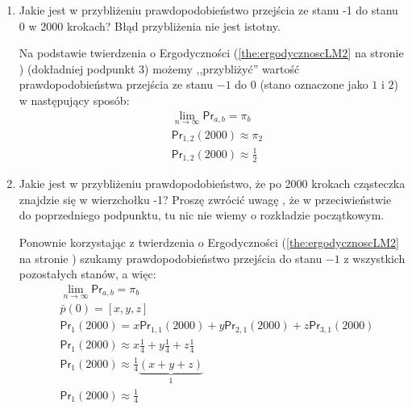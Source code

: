 \documentclass[a4paper,12pt]{article}
\theoremstyle{definition}%
\theoremstyle{definition}
\theoremstyle{problem}
\begin{document}
\begin{enumerate}[label=\alph*)]
\item Jakie jest w przybliżeniu prawdopodobieństwo przejścia ze stanu -1 do stanu 0 w 2000 krokach? Błąd przybliżenia nie jest istotny.

Na podstawie twierdzenia o Ergodyczności (\ref{the:ergodycznoscLM2} na stronie \pageref{the:ergodycznoscLM2}) (dokładniej podpunkt 3) możemy ,,przybliżyć'' wartość prawdopodobieństwa przejścia ze stanu $-1$ do $0$ (stano oznaczone jako $1$ i $2$) w następujący sposób:
\begin{align*}
&\lim _{n\rightarrow \infty} \mathsf{Pr}_{a,b}=\pi _b\\
&\mathsf{Pr}_{1,2}(2000)\approx \pi _2\\
&\mathsf{Pr}_{1,2}(2000)\approx \frac{1}{2}
\end{align*}
\item Jakie jest w przybliżeniu prawdopodobieństwo, że po 2000 krokach cząsteczka znajdzie się w wierzchołku -1? Proszę zwrócić uwagę , że w przeciwieństwie do poprzedniego podpunktu, tu nic nie wiemy o rozkładzie początkowym.

Ponownie korzystając z twierdzenia o Ergodyczności (\ref{the:ergodycznoscLM2} na stronie \pageref{the:ergodycznoscLM2}) szukamy prawdopodobieństwo przejścia do stanu $-1$ z wszystkich pozostałych stanów, a więc:
\begin{align*}
&\lim _{n\rightarrow \infty} \mathsf{Pr}_{a,b}=\pi _b\\
&\bar{p}(0)=\left[x,y, z\right]\\
&\mathsf{Pr}_1 (2000)=x\mathsf{Pr}_{1,1}(2000)+y\mathsf{Pr}_{2,1}(2000)+z\mathsf{Pr}_{3,1}(2000)\\
&\mathsf{Pr}_1 (2000)\approx x\frac{1}{4}+y\frac{1}{4}+z\frac{1}{4}\\
&\mathsf{Pr}_1 (2000)\approx \frac{1}{4}\underbrace{(x+y+z)}_1\\
&\mathsf{Pr}_1 (2000)\approx \frac{1}{4}
\end{align*}
\end{enumerate}
\end{document}
